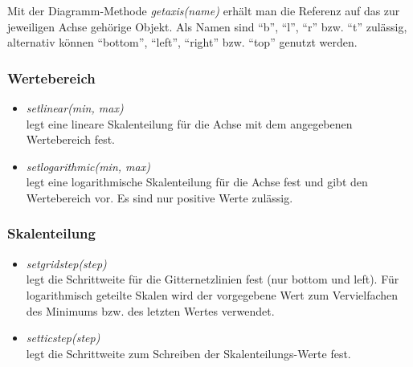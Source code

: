 \documentclass[ngerman,origlongtable]{scrartcl}
\begin{document}
Mit der Diagramm-Methode
\textit{get\textunderscore{}axis(name)\/} erhält man die Referenz auf das
zur jeweiligen Achse gehörige Objekt. Als Namen sind "`b"',
"`l"', "`r"' bzw. "`t"' zulässig, alternativ können
"`bottom"', "`left"', "`right"' bzw. "`top"' genutzt werden.

\subsubsection{Wertebereich}
\begin{itemize}
\item	\textit{set\textunderscore{}linear(min, max)\/}\\
legt eine lineare Skalenteilung für die Achse mit dem angegebenen
Wertebereich fest.
\item	\textit{set\textunderscore{}logarithmic(min, max)}\\
legt eine logarithmische Skalenteilung für die Achse fest und gibt den
Wertebereich vor. Es sind nur positive Werte zulässig.
\end{itemize}

\subsubsection{Skalenteilung}
\begin{itemize}
\item	\textit{set\textunderscore{}grid\textunderscore{}step(step)\/}\\
legt die Schrittweite für die Gitternetzlinien fest (nur bottom und left).
Für logarithmisch geteilte Skalen wird der vorgegebene Wert zum Vervielfachen
des Minimums bzw. des letzten Wertes verwendet.
\item	\textit{set\textunderscore{}tic\textunderscore{}step(step)\/}\\
legt die Schrittweite zum Schreiben der Skalenteilungs-Werte fest.
\end{itemize}
\end{document}
